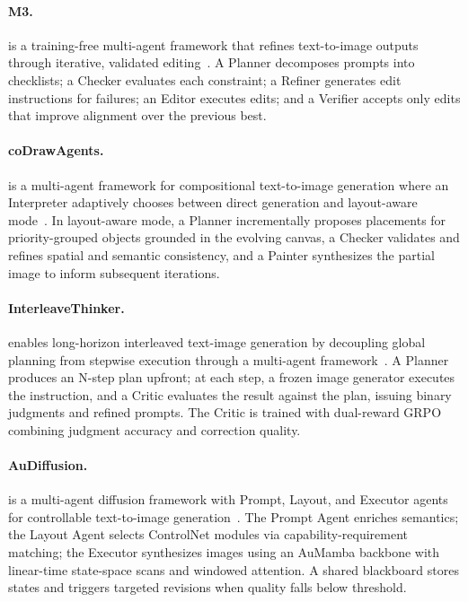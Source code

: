 \paragraph{M3.}
 is a training-free multi-agent framework that refines text-to-image outputs through iterative, validated editing~\cite{avg260206166}. A Planner decomposes prompts into checklists; a Checker evaluates each constraint; a Refiner generates edit instructions for failures; an Editor executes edits; and a Verifier accepts only edits that improve alignment over the previous best. 

\paragraph{coDrawAgents.}
 is a multi-agent  framework for compositional text-to-image generation where an Interpreter adaptively chooses between direct generation and layout-aware mode~\cite{avg260312829}. In layout-aware mode, a Planner incrementally proposes placements for priority-grouped objects grounded in the evolving canvas, a Checker validates and refines spatial and semantic consistency, and a Painter synthesizes the partial image to inform subsequent iterations. 


\paragraph{InterleaveThinker.}
 enables long-horizon interleaved text-image generation by decoupling global planning from stepwise execution through a multi-agent framework~\cite{avg260613679}. A Planner produces an N-step plan upfront; at each step, a frozen image generator executes the instruction, and a Critic evaluates the result against the plan, issuing binary judgments and refined prompts. The Critic is trained with dual-reward GRPO combining judgment accuracy and correction quality. 

\paragraph{AuDiffusion.}
 is a multi-agent diffusion framework with Prompt, Layout, and Executor agents for controllable text-to-image generation~\cite{avgdoi101007s40747025022111}. The Prompt Agent enriches semantics; the Layout Agent selects ControlNet modules via capability-requirement matching; the Executor synthesizes images using an AuMamba backbone with linear-time state-space scans and windowed attention. A shared blackboard stores states and triggers targeted revisions when quality falls below threshold.

